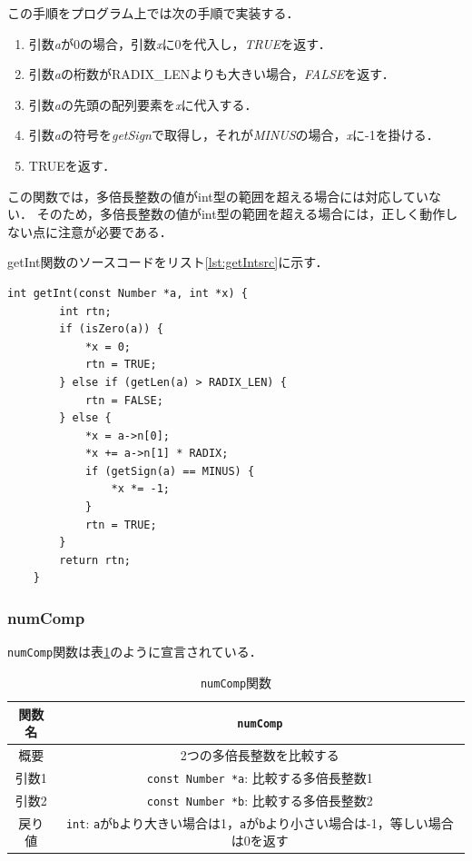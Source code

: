 \documentclass[a4paper,11pt,dvipdfmx]{jsarticle}
\begin{document}
この手順をプログラム上では次の手順で実装する．
\begin{enumerate}
    \item 引数\textit{a}が0の場合，引数\textit{x}に0を代入し，\textit{TRUE}を返す．
    \item 引数\textit{a}の桁数がRADIX\_LENよりも大きい場合，\textit{FALSE}を返す．
    \item 引数\textit{a}の先頭の配列要素を\textit{x}に代入する．
    \item 引数\textit{a}の符号を\textit{getSign}で取得し，それが\textit{MINUS}の場合，\textit{x}に-1を掛ける．
    \item TRUEを返す．
\end{enumerate}

この関数では，多倍長整数の値がint型の範囲を超える場合には対応していない．
そのため，多倍長整数の値がint型の範囲を超える場合には，正しく動作しない点に注意が必要である．

getInt関数のソースコードをリスト\ref{lst:getIntsrc}に示す．

\begin{lstlisting}[caption=getInt関数,label=lst:getIntsrc]
    int getInt(const Number *a, int *x) {
        int rtn;
        if (isZero(a)) {
            *x = 0;
            rtn = TRUE;
        } else if (getLen(a) > RADIX_LEN) {
            rtn = FALSE;
        } else {
            *x = a->n[0];
            *x += a->n[1] * RADIX;
            if (getSign(a) == MINUS) {
                *x *= -1;
            }
            rtn = TRUE;
        }
        return rtn;
    }
\end{lstlisting}

\subsubsection{numComp}
\texttt{numComp}関数は表\ref{table:lst:numComp}のように宣言されている．

\begin{table}[H]
\centering
\caption{\texttt{numComp}関数}
\label{table:lst:numComp}
\begin{tabular}{c||c}
\hline
関数名    & \texttt{numComp}   \\
\hline
概要    & 2つの多倍長整数を比較する   \\
\hline
引数1   & \texttt{const Number *a}: 比較する多倍長整数1  \\
引数2   & \texttt{const Number *b}: 比較する多倍長整数2  \\
\hline
戻り値    & \texttt{int}: \texttt{a}が\texttt{b}より大きい場合は1，\texttt{a}が\texttt{b}より小さい場合は-1，等しい場合は0を返す   \\
\hline
\end{tabular}
\end{table}
\end{document}
